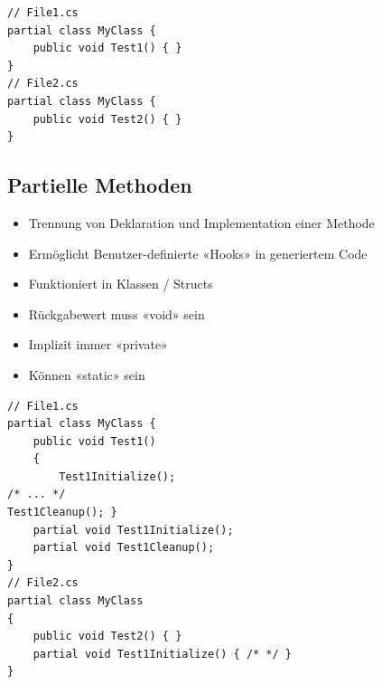 \begin{lstlisting}
// File1.cs
partial class MyClass {
    public void Test1() { }
}
// File2.cs
partial class MyClass {
    public void Test2() { }
}
\end{lstlisting}


\subsection{Partielle Methoden}

\begin{itemize}
    \item Trennung von Deklaration und Implementation einer Methode
    \item Ermöglicht Benutzer-definierte «Hooks» in generiertem Code
    \item Funktioniert in Klassen / Structs
    \item Rückgabewert muss «void» sein
    \item Implizit immer «private»
    \item Können «static» sein
\end{itemize}

\begin{lstlisting}
// File1.cs
partial class MyClass {
    public void Test1()
    {
        Test1Initialize();
/* ... */
Test1Cleanup(); }
    partial void Test1Initialize();
    partial void Test1Cleanup();
}
// File2.cs
partial class MyClass
{
    public void Test2() { }
    partial void Test1Initialize() { /* */ }
}
\end{lstlisting}

\newpage